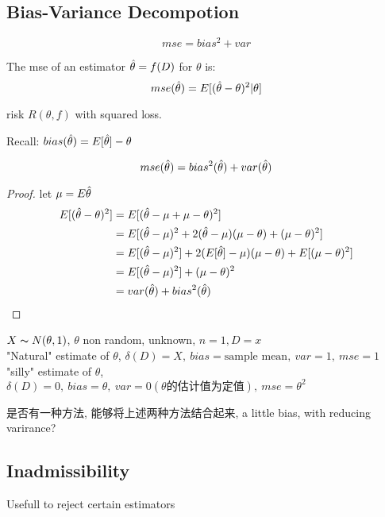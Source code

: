 \documentclass{article}
\begin{document}
\subsection{Bias-Variance Decompotion}
$$mse = bias^2 + var$$
\begin{definition}
The mse of an estimator $\hat{\theta} = f(D)$ for $\theta$ is:
$$mse(\hat{\theta}) = E[(\hat{\theta} - \theta)^2 | \theta]$$
\end{definition}
risk $R(\theta, f)$ with squared loss.

Recall: $bias(\hat{\theta}) = E[\hat{\theta}] - \theta$

\begin{proposition}
$$mse(\hat{\theta} ) = bias^2(\hat{\theta} ) + var(\hat{\theta} )$$
\end{proposition}
\begin{proof}
let $\mu = E\hat{\theta} $
$$
\begin{aligned}
E[(\hat{\theta} - \theta )^2]
& = E[(\hat{\theta} - \mu + \mu - \theta )^2] \\
& = E[(\hat{\theta} - \mu)^2 +  2 (\hat{\theta} - \mu) (\mu - \theta) + (\mu - \theta)^2] \\
& = E[(\hat{\theta} - \mu)^2] +  2 (E[\hat{\theta}] - \mu) (\mu - \theta) + E[(\mu - \theta)^2] \\
& = E[(\hat{\theta} - \mu)^2] + (\mu - \theta)^2 \\
& = var(\hat{\theta}) + bias^2(\hat{\theta})
\end{aligned}
$$
\end{proof}

\begin{example}
$X \thicksim{N}(\theta, 1)$, $\theta$ non random, unknown, $n=1, D=x$\\
"Natural" estimate of $\theta$, $\delta(D) = X,\ bias = \text{sample mean},\ var = 1,\ mse = 1$
"silly" estimate of $\theta$, $\delta(D) = 0,\ bias = \theta,\ var = 0(\text{$\theta$的估计值为定值}),\ mse = \theta^2$

是否有一种方法, 能够将上述两种方法结合起来, a little bias, with reducing varirance?
\end{example}

\subsection{Inadmissibility}
Usefull to reject certain estimators
\end{document}
